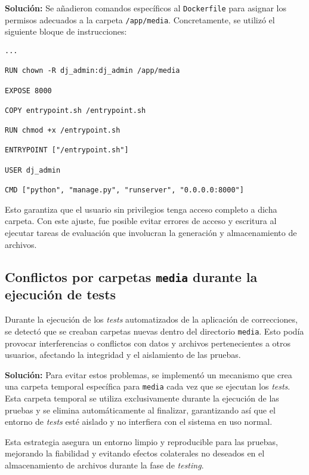 \textbf{Solución:} Se añadieron comandos específicos al \texttt{Dockerfile} para asignar los permisos adecuados a la carpeta \texttt{/app/media}. Concretamente, se utilizó el siguiente bloque de instrucciones:

\begin{verbatim}
...

RUN chown -R dj_admin:dj_admin /app/media

EXPOSE 8000

COPY entrypoint.sh /entrypoint.sh

RUN chmod +x /entrypoint.sh

ENTRYPOINT ["/entrypoint.sh"]

USER dj_admin

CMD ["python", "manage.py", "runserver", "0.0.0.0:8000"]

\end{verbatim}

Esto garantiza que el usuario sin privilegios tenga acceso completo a dicha carpeta. Con este ajuste, fue posible evitar errores de acceso y escritura al ejecutar tareas de evaluación que involucran la generación y almacenamiento de archivos.

\subsection*{Conflictos por carpetas \texttt{media} durante la ejecución de tests}

Durante la ejecución de los \textit{tests} automatizados de la aplicación de correcciones, se detectó que se creaban carpetas nuevas dentro del directorio \texttt{media}. Esto podía provocar interferencias o conflictos con datos y archivos pertenecientes a otros usuarios, afectando la integridad y el aislamiento de las pruebas.

\textbf{Solución:} Para evitar estos problemas, se implementó un mecanismo que crea una carpeta temporal específica para \texttt{media} cada vez que se ejecutan los \textit{tests}. Esta carpeta temporal se utiliza exclusivamente durante la ejecución de las pruebas y se elimina automáticamente al finalizar, garantizando así que el entorno de \textit{tests} esté aislado y no interfiera con el sistema en uso normal.

Esta estrategia asegura un entorno limpio y reproducible para las pruebas, mejorando la fiabilidad y evitando efectos colaterales no deseados en el almacenamiento de archivos durante la fase de \textit{testing}.

